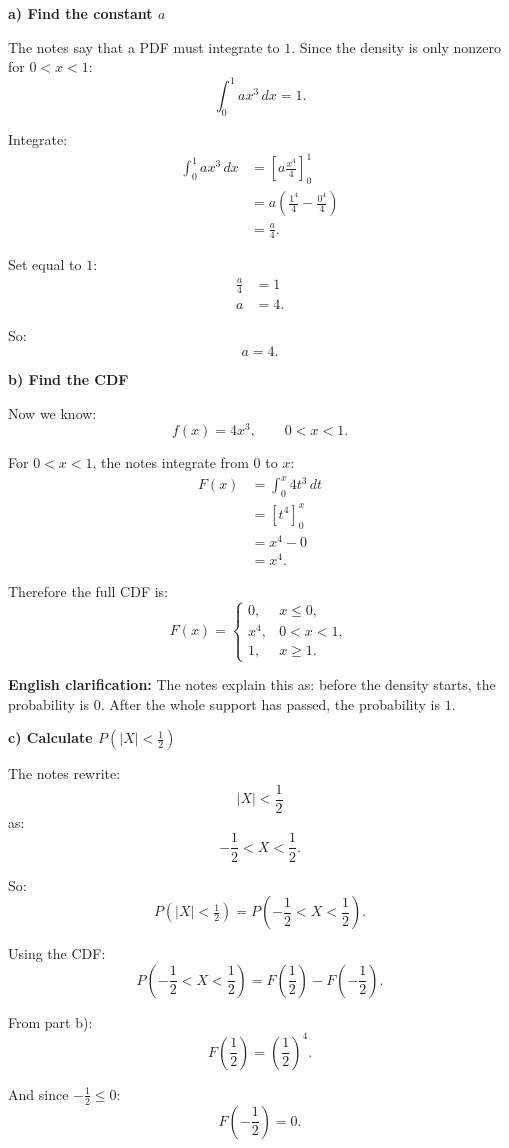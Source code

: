 \documentclass[10pt]{article}
\begin{document}
\textbf{a) Find the constant \(a\)}

The notes say that a PDF must integrate to \(1\).
Since the density is only nonzero for \(0<x<1\):
\[
\int_0^1 ax^3\,dx=1.
\]

Integrate:
\begin{align*}
\int_0^1 ax^3\,dx
&=
\left[
a\frac{x^4}{4}
\right]_0^1
\\[2mm]
&=
a\left(
\frac{1^4}{4}
-
\frac{0^4}{4}
\right)
\\[2mm]
&=
\frac{a}{4}.
\end{align*}

Set equal to \(1\):
\begin{align*}
\frac{a}{4}
&=1
\\[2mm]
a&=4.
\end{align*}

So:
\[
a=4.
\]

\textbf{b) Find the CDF}

Now we know:
\[
f(x)=4x^3,
\qquad 0<x<1.
\]

For \(0<x<1\), the notes integrate from \(0\) to
\(x\):
\begin{align*}
F(x)
&=
\int_0^x 4t^3\,dt
\\[2mm]
&=
\left[
t^4
\right]_0^x
\\[2mm]
&=
x^4-0
\\[2mm]
&=
x^4.
\end{align*}

Therefore the full CDF is:
\[
F(x)=
\begin{cases}
0,
& x\le 0,\\
x^4,
& 0<x<1,\\
1,
& x\ge 1.
\end{cases}
\]

\textbf{English clarification:}
The notes explain this as: before the density starts,
the probability is \(0\). After the whole support has
passed, the probability is \(1\).

\textbf{c) Calculate \(P(|X|<\frac12)\)}

The notes rewrite:
\[
|X|<\frac12
\]
as:
\[
-\frac12<X<\frac12.
\]

So:
\[
P(|X|<\tfrac12)
=
P\left(
-\frac12<X<\frac12
\right).
\]

Using the CDF:
\[
P\left(
-\frac12<X<\frac12
\right)
=
F\left(\frac12\right)
-
F\left(-\frac12\right).
\]

From part b):
\[
F\left(\frac12\right)
=
\left(\frac12\right)^4.
\]

And since \(-\frac12\le 0\):
\[
F\left(-\frac12\right)=0.
\]
\end{document}
